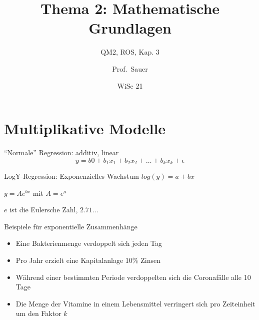 \documentclass[
  ngerman,
  ignorenonframetext,
]{beamer}
\title{Thema 2: Mathematische Grundlagen}
\subtitle{QM2, ROS, Kap. 3}
\author{Prof.~Sauer}
\date{WiSe 21}
\institute{AWM, HS Ansbach}
\providecommand{\tightlist}{%
  \setlength{\itemsep}{0pt}\setlength{\parskip}{0pt}}
\begin{document}
\frame{\titlepage}

\begin{frame}[allowframebreaks]
  \tableofcontents[hideallsubsections]
\end{frame}
\hypertarget{multiplikative-modelle}{%
\section{Multiplikative Modelle}\label{multiplikative-modelle}}

\begin{frame}{``Normale'' Regression: additiv, linear}
\protect\hypertarget{normale-regression-additiv-linear}{}
\[y = b0 + b_1x_1 + b_2 x_2 + \ldots + b_k x_k + \epsilon\]
\end{frame}

\begin{frame}{LogY-Regression: Exponenzielles Wachstum}
\protect\hypertarget{logy-regression-exponenzielles-wachstum}{}
\(log(y) = a + bx\)

\(y= Ae^{bx}\) mit \(A=e^a\)

\(e\) ist die Eulersche Zahl, \(2.71...\)
\end{frame}

\begin{frame}{Beispiele für exponentielle Zusammenhänge}
\protect\hypertarget{beispiele-fuxfcr-exponentielle-zusammenhuxe4nge}{}
\begin{itemize}
\tightlist
\item
  Eine Bakterienmenge verdoppelt sich jeden Tag
\item
  Pro Jahr erzielt eine Kapitalanlage 10\% Zinsen
\item
  Während einer bestimmten Periode verdoppelten sich die Coronafälle
  alle 10 Tage
\item
  Die Menge der Vitamine in einem Lebensmittel verringert sich pro
  Zeiteinheit um den Faktor \(k\)
\end{itemize}
\end{frame}

\end{document}
